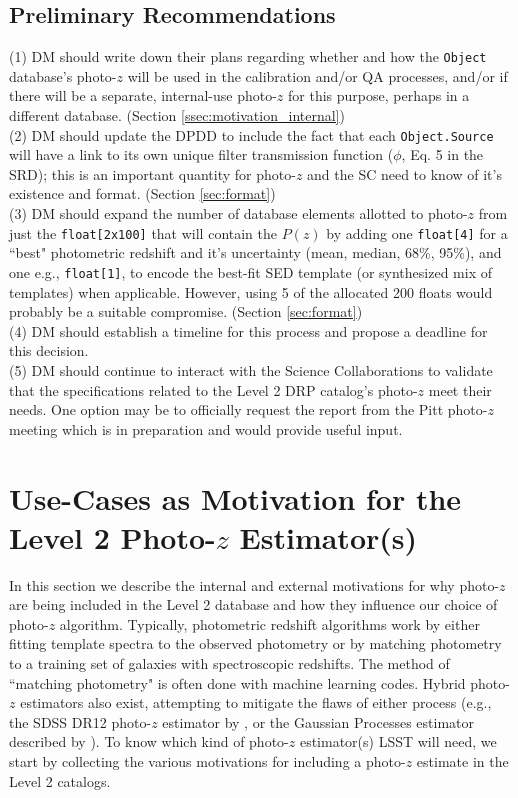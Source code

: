 \documentclass[DM,lsstdraft,toc]{lsstdoc}
\begin{document}
\subsection{Preliminary Recommendations}\label{ssec:intro_pr}

\noindent (1) DM should write down their plans regarding whether and how the {\tt Object} database's photo-$z$ will be used in the calibration and/or QA processes, and/or if there will be a separate, internal-use photo-$z$ for this purpose, perhaps in a different database. (Section \ref{ssec:motivation_internal}) \\
(2) DM should update the DPDD to include the fact that each {\tt Object.Source} will have a link to its own unique filter transmission function ($\phi$, Eq. 5 in the SRD); this is an important quantity for photo-$z$ and the SC need to know of it's existence and format. (Section \ref{sec:format}) \\
(3) DM should expand the number of database elements allotted to photo-$z$ from just the {\tt float[2x100]} that will contain the $P(z)$ by adding one {\tt float[4]} for a ``best" photometric redshift and it's uncertainty (mean, median, 68\%, 95\%), and one e.g., {\tt float[1]}, to encode the best-fit SED template (or synthesized mix of templates) when applicable. However, using 5 of the allocated 200 floats would probably be a suitable compromise. (Section \ref{sec:format}) \\
(4) DM should establish a timeline for this process and propose a deadline for this decision. \\
(5) DM should continue to interact with the Science Collaborations to validate that the specifications related to the Level 2 DRP catalog's photo-$z$ meet their needs. One option may be to officially request the report from the Pitt photo-$z$ meeting which is in preparation and would provide useful input.


\section{Use-Cases as Motivation for the Level 2 Photo-$z$ Estimator(s)}\label{sec:motivation}

In this section we describe the internal and external motivations for why photo-$z$ are being included in the Level 2 database and how they influence our choice of photo-$z$ algorithm. Typically, photometric redshift algorithms work by either fitting template spectra to the observed photometry or by matching photometry to a training set of galaxies with spectroscopic redshifts. The method of ``matching photometry" is often done with machine learning codes. Hybrid photo-$z$ estimators also exist, attempting to mitigate the flaws of either process (e.g., the SDSS DR12 photo-$z$ estimator by \citealt{2016MNRAS.460.1371B}, or the Gaussian Processes estimator described by \citealt{2016arXiv161200847L}). To know which kind of photo-$z$ estimator(s) LSST will need, we start by collecting the various motivations for including a photo-$z$ estimate in the Level 2 catalogs.
\end{document}
